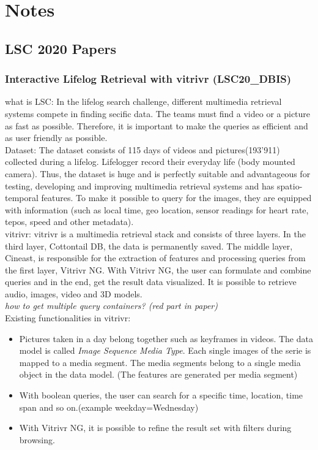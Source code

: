 \chapter{Notes}

\section{LSC 2020 Papers}

\subsection{Interactive Lifelog Retrieval with vitrivr (LSC20\_DBIS)}
what is LSC: In the lifelog search challenge, different multimedia retrieval systems compete in finding secific data. The teams must find a video or a picture as fast as possible. Therefore, it is important to make the queries as efficient and as user friendly as possible. 
\\
Dataset: The dataset consists of 115 days of videos and pictures(193'911) collected during a lifelog. Lifelogger record their everyday life (body mounted camera). Thus, the dataset is huge and is perfectly suitable and advantageous for testing, developing and improving multimedia retrieval systems and has spatio-temporal features. To make it possible to query for the images, they are equipped with information (such as local time, geo location, sensor readings for heart rate, tepos, speed and other metadata).
\\
vitrivr: vitrivr is a multimedia retrieval stack and consists of three layers. In the third layer, Cottontail DB, the data is permanently saved. The middle layer, Cineast, is responsible for the extraction of features and processing queries from the first layer, Vitrivr NG. With Vitrivr NG, the user can formulate and combine queries and in the end, get the result data visualized.
It is possible to retrieve audio, images, video and 3D models. 
\\
\textit{how to get multiple query containers? (red part in paper)} 
\\
Existing functionalities in vitrivr: 
\begin{itemize}
\item Pictures taken in a day belong together such as keyframes in videos. The data model is called \textit{Image Sequence Media Type}. Each single images of the serie is mapped to a media segment. The media segments belong to a single media object in the data model. (The features are generated per media segment)

\item With boolean queries, the user can search for a specific time, location, time span and so on.(example weekday=Wednesday)

\item With Vitrivr NG, it is possible to refine the result set with filters during browsing.
\end{itemize}
